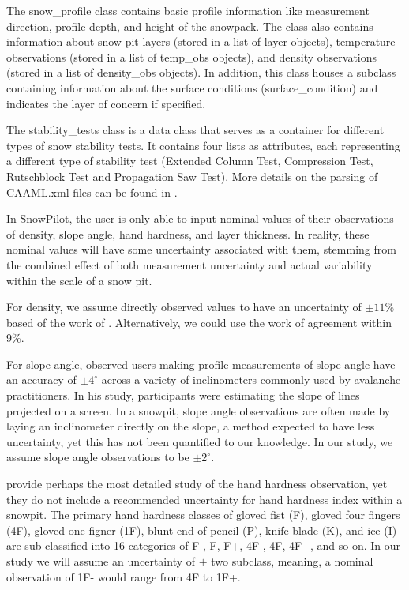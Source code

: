 \documentclass[journal abbreviation, manuscript]{copernicus}
\begin{document}
The snow\_profile class contains basic profile information like measurement direction, profile depth, and height of the snowpack. The class also contains information about snow pit layers (stored in a list of layer objects), temperature observations (stored in a list of temp\_obs objects), and density observations (stored in a list of density\_obs objects). In addition, this class houses a subclass containing information about the surface conditions (surface\_condition) and indicates the layer of concern if specified.

The stability\_tests class is a data class that serves as a container for different types of snow stability tests. It contains four lists as attributes, each representing a different type of stability test (Extended Column Test, Compression Test, Rutschblock Test and Propagation Saw Test). More details on the parsing of CAAML.xml files can be found in \citet{connelly2025}.

In SnowPilot, the user is only able to input nominal values of their observations of density, slope angle, hand hardness, and layer thickness. In reality, these nominal values will have some uncertainty associated with them, stemming from the combined effect of both measurement uncertainty and actual variability within the scale of a snow pit.

For density, we assume directly observed values to have an uncertainty of $\pm 11\%$ based of the work of \citep{conger2009}. Alternatively, we could use the work of \citet{proksch2016} agreement within 9\%.

For slope angle, \citet{mccammonSLOPEMEASUREMENTHUMANS2023} observed users making profile measurements of slope angle have an accuracy of $\pm4^{\circ}$ across a variety of inclinometers commonly used by avalanche practitioners. In his study, participants were estimating the slope of lines projected on a screen. In a snowpit, slope angle observations are often made by laying an inclinometer directly on the slope, a method expected to have less uncertainty, yet this has not been quantified to our knowledge. In our study, we assume slope angle observations to be $\pm2^{\circ}$.

\citet{holler2010} provide perhaps the most detailed study of the hand hardness observation, yet they do not include a recommended uncertainty for hand hardness index within a snowpit. The primary hand hardness classes of gloved fist (F), gloved four fingers (4F), gloved one figner (1F), blunt end of pencil (P), knife blade (K), and ice (I) are sub-classified into 16 categories of F-, F, F+, 4F-, 4F, 4F+, and so on. In our study we will assume an uncertainty of $\pm$ two subclass, meaning, a nominal observation of 1F- would range from 4F to 1F+.
\end{document}
